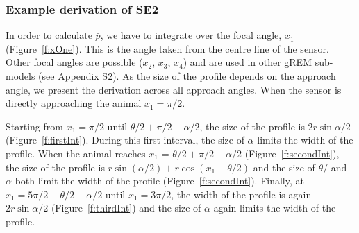 \documentclass[a4paper,10pt,reqno,oneside]{amsart}
\begin{document}
\subsubsection{Example derivation of SE2}

In order to calculate $\bar{p}$, we have to integrate over the focal angle, $x_1$ (Figure~\ref{f:xOne}). This is the angle taken from the centre line of the sensor. Other focal angles are possible ($x_2$, $x_3$, $x_4$) and are used in other gREM sub-models (see Appendix S2). As the size of the profile depends on the approach angle, we present the derivation across all approach angles. When the sensor is directly approaching the animal $x_1  = \pi/2$.

Starting from $x_1 = \pi/2$ until $\theta/2 + \pi/2 - \alpha/2$, the size of the profile is $2r\sin \alpha/2$ (Figure~\ref{f:firstInt}). During this first interval, the size of $\alpha$ limits the width of the profile. When the animal reaches $x_1$  = $\theta/2 + \pi/2 - \alpha/2$ (Figure~\ref{f:secondInt}), the size of the profile is $r\sin( \alpha/2) + r\cos( x_1  - \theta/2)$ and the size of $\theta/$ and $\alpha$ both limit the width of the profile (Figure~\ref{f:secondInt}). Finally, at $x_1  = 5\pi/2 - \theta/2  - \alpha/2$ until $x_1  = 3\pi/2$, the width of the profile is again $2r\sin\alpha/2$ (Figure~\ref{f:thirdInt}) and the size of $\alpha$ again limits the width of the profile. 
\end{document}
